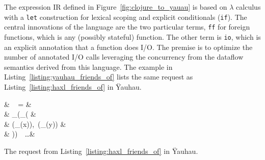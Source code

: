 The expression \ac{IR} defined in Figure~\ref{fig:clojure_to_yauau} is based on $\lambda$ calculus with a \texttt{let} construction for lexical scoping and explicit conditionals (\texttt{if}).
The central innovations of the language are the two particular terms, \texttt{ff} for foreign functions, which is any (possibly stateful) function.
The other term is \texttt{io}, which is an explicit annotation that a function does \ac{I/O}.
The premise is to optimize the number of annotated \ac{I/O} calls leveraging the concurrency from the dataflow semantics derived from this language.
The example in Listing~\ref{listing:yauhau_friends_of} lists the same request as Listing~\ref{listing:haxl_friends_of} in \"{Y}auhau.


\begin{listing}
\begin{flalign*}
& ~ = & \\ 
& \quad {}_(_( & \\ 
& \quad \quad {}(_(x)),~(_(y)) & \\
& \quad ))~~\ldots & 
\end{flalign*}
\caption{The request from Listing~\ref{listing:haxl_friends_of} in \"{Y}auhau.}
\label{listing:yauhau_friends_of}
\end{listing}



